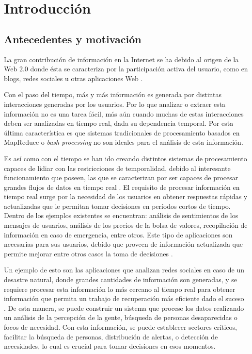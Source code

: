 \chapter{Introducci\'on}
\label{cap:introduccion}

\section{Antecedentes y motivaci\'on}
\label{intro:motivacion}

La gran contribuci\'on de informaci\'on en la Internet se ha debido al origen de la Web 2.0 donde \'esta se caracteriza por la participaci\'on activa del usuario, \normalsize{como} en blogs, redes sociales u otras aplicaciones Web \citep{web2007oberhelman}.


Con el paso del tiempo, m\'as y m\'as informaci\'on es generada por distintas interacciones generadas por los usuarios. \normalsize{Por lo que analizar} o extraer esta informaci\'on no es una tarea f\'acil, m\'as a\'un cuando muchas de estas interacciones deben ser analizadas en tiempo real, dada su dependencia temporal. Por esta \'ultima caracter\'istica es que sistemas tradicionales de procesamiento basados en MapReduce \citep{2010Lin} o \textit{bash processing} \citep{HawwashN14} no son ideales para el an\'alisis de esta informaci\'on.

Es as\'i como con el tiempo se han ido creando distintos sistemas de procesamiento capaces de lidiar con las restricciones de temporalidad, debido al interesante funcionamiento que poseen, las que se caracterizan por ser capaces de procesar grandes flujos de datos en tiempo real \citep{ChenZ14a}. El requisito de procesar informaci\'on en tiempo real surge por la necesidad de los usuarios en obtener respuestas r\'apidas y actualizadas que le permitan tomar decisiones en per\'iodos cortos de tiempo. Dentro de los ejemplos existentes se encuentran: an\'alisis de sentimientos de los mensajes de usuarios, an\'alisis de los precios de la bolsa de valores, recopilaci\'on de informaci\'on en caso de emergencia, entre otros. Este tipo de aplicaciones son necesarias para sus usuarios, debido que proveen de informaci\'on actualizada que permite mejorar entre otros casos la toma de decisiones \citep{Wenzel14}.

Un ejemplo de esto son las aplicaciones que analizan redes sociales en caso de un desastre natural, donde grandes cantidades de informaci\'on son generadas, y se requiere procesar esta informaci\'on lo m\'as cercano al tiempo real para obtener informaci\'on que permita un trabajo de recuperaci\'on m\'as eficiente dado el suceso \citep{andrade2014fundamentals}. De esta manera, se puede construir un sistema que procese los datos realizando un an\'alisis de la percepci\'on de la gente, b\'usqueda de personas desaparecidas o focos de necesidad. Con esta informaci\'on, se puede establecer sectores cr\'iticos, facilitar la b\'usqueda de personas, distribuci\'on de alertas, o detecci\'on de necesidades, lo cual es crucial para tomar decisiones en esos momentos.

